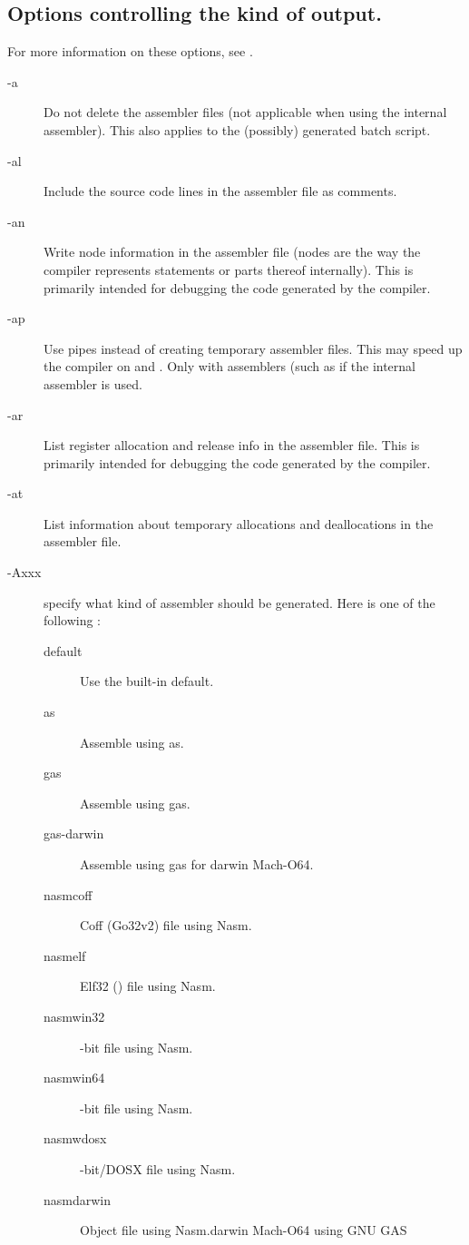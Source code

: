 \subsection{Options controlling the kind of output.}
\label{se:codegen}
For more information on these options, see \progref.
\begin{description}
\item [-a]  Do not delete the assembler files (not
applicable when using the internal assembler). This also applies
to the (possibly) generated batch script.
\item [-al]  Include the source code lines in the assembler
file as comments.
\item[-an]  Write node information in the
assembler file (nodes are the way the compiler represents statements or parts
thereof internally). This is primarily intended for debugging
the code generated by the compiler.
\item[-ap]  Use pipes instead of creating temporary assembler
files.  This may speed up the compiler on \ostwo and \linux.
Only with assemblers (such as \gnu %
if the internal assembler is used.
\item[-ar]  List register allocation and
release info in the assembler file. This is primarily intended for debugging
the code generated by the compiler.
\item[-at]  List information about
temporary allocations and deallocations in the assembler file.
\item [-Axxx]  specify what kind of assembler should be generated.
Here  is one of the following :
\begin{description}
\item[default] Use the built-in default.
\item[as] Assemble using \gnu as.
\item[gas] Assemble using \gnu gas.
\item[gas-darwin] Assemble using \gnu gas for darwin Mach-O64.
\item[nasmcoff] Coff (Go32v2) file using Nasm.
\item[nasmelf] Elf32 (\linux) file using Nasm.
\item[nasmwin32] -bit file using Nasm.
\item[nasmwin64] -bit file using Nasm.
\item[nasmwdosx] -bit/DOSX file using Nasm.
\item[nasmdarwin] Object file using Nasm.darwin Mach-O64 using GNU GAS

\end{description}
\end{description}
